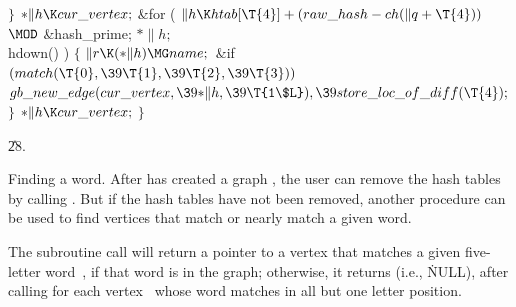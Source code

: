\4${}\}{}$\2\6
${}{*}\|h\K\\{cur\_vertex};$ \&{for} ( $\|h\K\\{htab}[\T{4}]+(\\{raw\_hash}-%
\\{ch}(\|q+\T{4}))$ $\MOD$ \&{hash\_prime};\7
${}{*}\|h;$ \\{hdown}() ) \6
${}\{{}$\1\6
${}\|r\K({*}\|h)\MG\\{name};{}$\6
\&{if} ${}(\\{match}(\T{0},\39\T{1},\39\T{2},\39\T{3})){}$\1\5
${}\\{gb\_new\_edge}(\\{cur\_vertex},\39{*}\|h,\39\T{1\$L}),\39\\{store\_loc%
\_of\_diff}(\T{4});{}$\2\6
\4${}\}{}$\2\6
${}{*}\|h\K\\{cur\_vertex};$ $\}{}$\par
\U28.\fi

Finding a word. After  has created a graph , the
user can
remove the hash tables by calling . But
if the
hash tables have not been removed, another procedure can be used to
find vertices that match or nearly match a given word.

The subroutine call  will return a pointer to a
vertex
that matches a given five-letter word~, if that word is in the graph;
otherwise, it returns \PB{$\NULL$} (i.e., \.{NULL}), after calling  for
each vertex~ whose word matches  in all but one letter
position.

